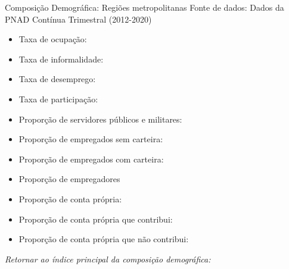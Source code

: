 \begin{frame}[label=_composicao_demografica_regiao_metro]{Composição Demográfica: Regiões metropolitanas}
{\footnotesize Fonte de dados: Dados da PNAD Contínua Trimestral (2012-2020)}
\begin{itemize}
\item{Taxa de ocupação: \hyperlink{_composicao_demografica_regiao_metro_taxa_de_ocupacao}{}}
\item{Taxa de informalidade: \hyperlink{_composicao_demografica_regiao_metro_taxa_de_informalidade}{}}
\item{Taxa de desemprego: \hyperlink{_composicao_demografica_regiao_metro_taxa_de_desemprego}{}}
\item{Taxa de participação: \hyperlink{_composicao_demografica_regiao_metro_taxa_de_participacao}{}}
\item{Proporção de servidores públicos e militares: \hyperlink{_composicao_demografica_regiao_metro_prop_militar}{}}
\item{Proporção de empregados sem carteira: \hyperlink{_composicao_demografica_regiao_metro_prop_empregadoSC}{}}
\item{Proporção de empregados com carteira: \hyperlink{_composicao_demografica_regiao_metro_prop_empregadoCC}{}}
\item{Proporção de empregadores \hyperlink{_composicao_demografica_regiao_metro_prop_empregador}{}}
\item{Proporção de conta própria: \hyperlink{_composicao_demografica_regiao_metro_prop_cpropria}{}}
\item{Proporção de conta própria que contribui: \hyperlink{_composicao_demografica_regiao_metro_prop_cpropriaC}{}}
\item{Proporção de conta própria que não contribui: \hyperlink{_composicao_demografica_regiao_metro_prop_cpropriaNc}{}}
\end{itemize}

\begin{small}
\textit{Retornar ao índice principal da composição demográfica: \hyperlink{_composicao_demografica}{} }
\end{small}

\end{frame}

